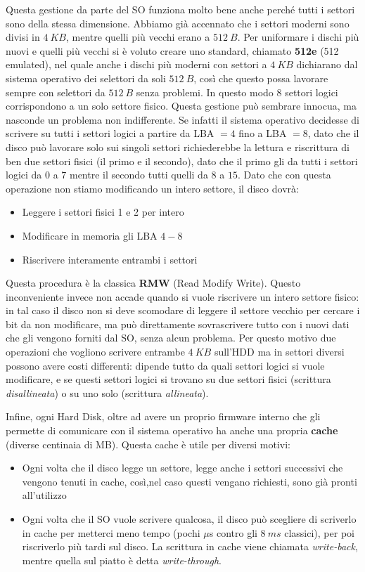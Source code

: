 \documentclass[11pt, a4paper, titlepage, oneside]{scrbook}
\begin{document}
Questa gestione da parte del SO funziona molto bene anche perché tutti i settori sono della stessa dimensione. Abbiamo già accennato che i settori moderni sono divisi in $\SI{4}{KB}$, mentre quelli più vecchi erano a $\SI{512}{B}$. Per uniformare i dischi più nuovi e quelli più vecchi si è voluto creare uno standard, chiamato \textbf{512e} (512 emulated), nel quale anche i dischi più moderni con settori a $\SI{4}{KB}$ dichiarano dal sistema operativo dei selettori da soli $\SI{512}{B}$, così che questo possa lavorare sempre con selettori da $\SI{512}{B}$ senza problemi. In questo modo 8 settori logici corrispondono a un solo settore fisico. Questa gestione può sembrare innocua, ma nasconde un problema non indifferente. Se infatti il sistema operativo decidesse di scrivere su tutti i settori logici a partire da LBA $=4$ fino a LBA $= 8$, dato che il disco può lavorare solo sui singoli settori richiederebbe la lettura e riscrittura di ben due settori fisici (il primo e il secondo), dato che il primo gli da tutti i settori logici da $0$ a $7$ mentre il secondo tutti quelli da $8$ a $15$. Dato che con questa operazione non stiamo modificando un intero settore, il disco dovrà:
\begin{itemize}
    \item Leggere i settori fisici 1 e 2 per intero
    \item Modificare in memoria gli LBA $4-8$
    \item Riscrivere interamente entrambi i settori
\end{itemize}
Questa procedura è la classica \textbf{RMW} (Read Modify Write). Questo inconveniente invece non accade quando si vuole riscrivere un intero settore fisico: in tal caso il disco non si deve scomodare di leggere il settore vecchio per cercare i bit da non modificare, ma può direttamente sovrascrivere tutto con i nuovi dati che gli vengono forniti dal SO, senza alcun problema. Per questo motivo due operazioni che vogliono scrivere entrambe $\SI{4}{KB}$ sull'HDD ma in settori diversi possono avere costi differenti: dipende tutto da quali settori logici si vuole modificare, e se questi settori logici si trovano su due settori fisici (scrittura \textit{disallineata}) o su uno solo (scrittura \textit{allineata}).

Infine, ogni Hard Disk, oltre ad avere un proprio firmware interno che gli permette di comunicare con il sistema operativo ha anche una propria \textbf{cache} (diverse centinaia di MB). Questa cache è utile per diversi motivi:
\begin{itemize}
    \item Ogni volta che il disco legge un settore, legge anche i settori successivi che vengono tenuti in cache, così,nel caso questi vengano richiesti, sono già pronti all'utilizzo
    \item Ogni volta che il SO vuole scrivere qualcosa, il disco può scegliere di scriverlo in cache per metterci meno tempo (pochi $\mu$s contro gli $\SI{8}{ms}$ classici), per poi riscriverlo più tardi sul disco. La scrittura in cache viene chiamata \textit{write-back}, mentre quella sul piatto è detta \textit{write-through}.
\end{itemize}
\end{document}
